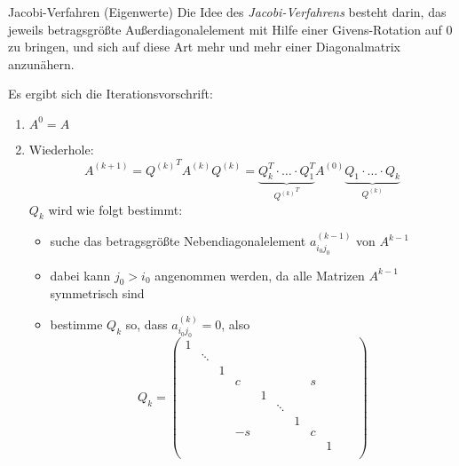 \begin{defi}{Jacobi-Verfahren (Eigenwerte)}
    Die Idee des \emph{Jacobi-Verfahrens} besteht darin, das jeweils betragsgrößte Außerdiagonalelement mit Hilfe einer Givens-Rotation auf $0$ zu bringen, und sich auf diese Art mehr und mehr einer Diagonalmatrix anzunähern.

    Es ergibt sich die Iterationsvorschrift:
    \begin{enumerate}
        \item $A^{0} = A$
        \item Wiederhole:
              \[
                  A^{(k+1)} = {Q^{(k)}}^T A^{(k)} Q^{(k)} = \underbrace{Q_k^T \cdot \ldots \cdot Q_1^T}_{{Q^{(k)}}^T} A^{(0)} \underbrace{Q_1 \cdot \ldots \cdot Q_k}_{Q^{(k)}}
              \]
              $Q_k$ wird wie folgt bestimmt:
              \begin{itemize}
                  \item suche das betragsgrößte Nebendiagonalelement $a_{i_0 j_0}^{(k-1)}$ von $A^{k-1}$
                  \item dabei kann $j_0 > i_0$ angenommen werden, da alle Matrizen $A^{k-1}$ symmetrisch sind
                  \item bestimme $Q_k$ so, dass $a_{i_0 j_0}^{(k)} = 0$, also
                        \[
                            Q_k =
                            \begin{pmatrix}
                                1 &        &   &    &   &        &   &   &   &        &   \\
                                  & \ddots &   &    &   &        &   &   &   &        &   \\
                                  &        & 1 &    &   &        &   &   &   &        &   \\
                                  &        &   & c  &   &        &   & s &   &        &   \\
                                  &        &   &    & 1 &        &   &   &   &        &   \\
                                  &        &   &    &   & \ddots &   &   &   &        &   \\
                                  &        &   &    &   &        & 1 &   &   &        &   \\
                                  &        &   & -s &   &        &   & c &   &        &   \\
                                  &        &   &    &   &        &   &   & 1 &        &   \\

\end{pmatrix}\]
\end{itemize}
\end{enumerate}
\end{defi}
